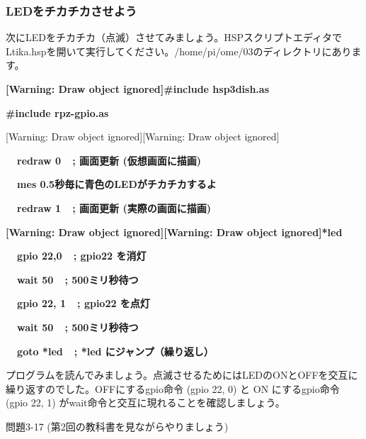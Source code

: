 \documentclass[a4paper,dvipdfmx]{jarticle}
\begin{document}
\subsubsection{}
\clearpage\subsubsection{LEDをチカチカさせよう}
次にLEDをチカチカ（点滅）させてみましょう。HSPスクリプトエディタでLtika.hspを開いて実行してください。/home/pi/ome/03のディレクトリにあります。

{\ttfamily\bfseries
[Warning: Draw object ignored]\#include {\textquotedbl}hsp3dish.as{\textquotedbl}}

{\ttfamily\bfseries
\#include {\textquotedbl}rpz-gpio.as{\textquotedbl}}

[Warning: Draw object ignored][Warning: Draw object ignored]

{\ttfamily\bfseries
\ \ redraw 0\ \ \textcolor[rgb]{0.0,0.0,0.8}{; 画面更新
(仮想画面に描画)}}

{\ttfamily\bfseries
\ \ mes
{\textquotedbl}0.5秒毎に青色のLEDがチカチカするよ{\textquotedbl}}

{\ttfamily\bfseries
\ \ redraw 1\ \ \textcolor[rgb]{0.0,0.0,0.8}{; 画面更新
(実際の画面に描画)}}


\bigskip

{\ttfamily\bfseries
[Warning: Draw object ignored][Warning: Draw object ignored]*led}

{\ttfamily\bfseries
\ \ gpio 22,0\ \ \textcolor[rgb]{0.0,0.0,0.8}{; gpio22 を消灯}}

{\ttfamily\bfseries
\ \ wait 50\ \ \textcolor[rgb]{0.0,0.0,0.8}{; 500ミリ秒待つ}}

{\ttfamily\bfseries
\ \ gpio 22, 1\ \ \textcolor[rgb]{0.0,0.0,0.8}{; gpio22 を点灯}}

{\ttfamily\bfseries
\ \ wait 50\ \ \textcolor[rgb]{0.0,0.0,0.8}{; 500ミリ秒待つ}}

{\ttfamily\bfseries
\ \ goto *led\ \ \textcolor[rgb]{0.0,0.0,0.8}{; *led
にジャンプ（繰り返し）}}


\bigskip

プログラムを読んでみましょう。点滅させるためにはLEDのONとOFFを交互に繰り返すのでした。OFFにするgpio命令
(gpio 22, 0) と ON にするgpio命令 (gpio 22, 1)
がwait命令と交互に現れることを確認しましょう。

{\ttfamily
問題3-17
(第2回の教科書を見ながらやりましょう)}
\end{document}
